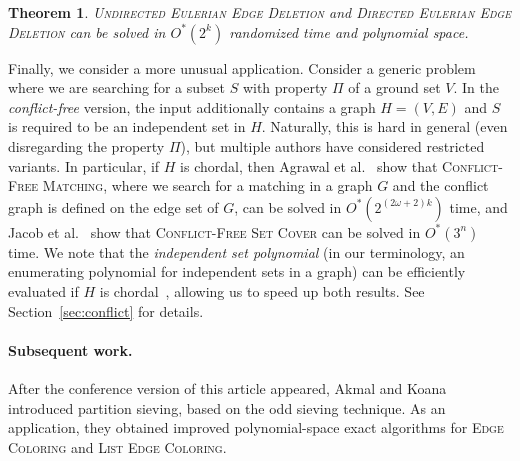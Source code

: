 \documentclass[10pt,a4paper]{article}
\newtheorem{theorem}{Theorem}[section]
\begin{document}
\begin{theorem} \label{ithm:euler}
  \textsc{Undirected Eulerian Edge Deletion} and \textsc{Directed
    Eulerian Edge Deletion} can be solved in $O^*(2^k)$ randomized time and
  polynomial space.
\end{theorem}

Finally, we consider a more unusual application. Consider a generic
problem where we are searching for a subset $S$ with property $\Pi$ of a ground set $V$.
In the \emph{conflict-free} version, the input additionally contains a graph $H=(V,E)$
and $S$ is required to be an independent set in $H$. Naturally,
this is hard in general (even disregarding the property $\Pi$),
but multiple authors have considered restricted variants. 
In particular, if $H$ is chordal, then 
Agrawal et al.~\cite{AgrawalJKS20} show that \textsc{Conflict-Free Matching}, where we search for a matching in a graph $G$ and the conflict graph is defined on the edge set of $G$,
can be solved in $O^*(2^{(2\omega + 2)k})$ time, and 
Jacob et al.~\cite{JacobMR21} show that \textsc{Conflict-Free Set Cover}
can be solved in $O^*(3^n)$ time.
We note that the \emph{independent set polynomial} (in our
terminology, an enumerating polynomial for independent sets in a graph)
can be efficiently evaluated if $H$ is chordal~\cite{AchlioptasZ21},
allowing us to speed up both results. See Section~\ref{sec:conflict} for details.

\paragraph{Subsequent work.} After the conference version of this article appeared, Akmal and Koana~\cite{AkmalK25} introduced partition sieving, based on the odd sieving technique. As an application, they obtained improved polynomial-space exact algorithms for \textsc{Edge Coloring} and \textsc{List Edge Coloring}.
\end{document}
